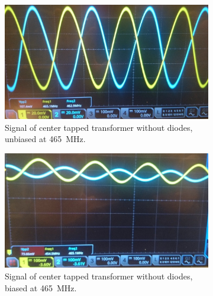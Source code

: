 \begin{figure}[ht]
	\centering
	\begin{subfigure}{0.4\textwidth}
		\centering
		\includegraphics[width=\textwidth]{Chapters/Deflection/unbiased3}
		\caption{Signal of center tapped transformer without diodes, unbiased at \SI{465}{\mega\hertz}.}
		\label{fig:unbiased2}
	\end{subfigure}
	\hspace{0.1\textwidth}
	\begin{subfigure}{0.4\textwidth}
		\centering
		\includegraphics[width=\textwidth]{Chapters/Deflection/biased3}
		\caption{Signal of center tapped transformer without diodes, biased at \SI{465}{\mega\hertz}.}
		\label{fig:biased2}
	\end{subfigure}
	\caption{}
	\label{fig:CTTSignal}
\end{figure}




